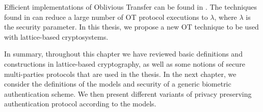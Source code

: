 Efficient implementations of Oblivious Transfer can be found in
\cite{naor2001efficient35}. The techniques found in \cite{ishai2003extending24}
can reduce a large number of OT protocol executions to \(\lambda\), where
\(\lambda\) is the security parameter. In this thesis, we propose a new OT
technique to be used with lattice-based cryptosystems.

In summary, throughout this chapter we have reviewed basic definitions and
constructions in lattice-based cryptography, as well as some notions of secure
multi-parties protocols that are used in the thesis. In the next chapter, we
consider the definitions of the models and security of a generic biometric
authentication scheme. We then present different variants of privacy preserving
authentication protocol according to the models.

